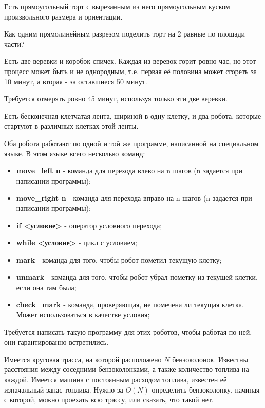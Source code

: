 \begin{problem}

Есть прямоугольный торт с вырезанным из него прямоугольным куском произвольного размера и ориентации.

Как одним прямолинейным разрезом поделить торт на 2 равные по площади части?

\end{problem}
\begin{problem}

Есть две веревки и коробок спичек. Каждая из веревок горит ровно час, но этот процесс может быть и не однородным, т.е. первая её половина может сгореть за 10 минут, а вторая - за оставшиеся 50 минут.

Требуется отмерять ровно 45 минут, используя только эти две веревки.

\end{problem}
\begin{problem}

Есть бесконечная клетчатая лента, шириной в одну клетку, и два робота, которые стартуют в различных клетках этой ленты.

Оба робота работают по одной и той же программе, написанной на специальном языке.
В этом языке всего несколько команд:
\begin{itemize}
\item \textbf{move\_left n} - команда для перехода влево на n шагов (n задается при написании программы);
\item \textbf{move\_right n} - команда для перехода вправо на n шагов (n задается при написании программы);
\item \textbf{if <условие>} - оператор условного перехода;
\item \textbf{while <условие>} - цикл с условием;
\item \textbf{mark} - команда для того, чтобы робот пометил текущую клетку;
\item \textbf{unmark} - команда для того, чтобы робот убрал пометку из текущей клетки, если она там была;
\item \textbf{check\_mark} - команда, проверяющая, не помечена ли текущая клетка. Может использоваться в качестве условия;
\end{itemize}

Требуется написать такую программу для этих роботов, чтобы работая по ней, они гарантированно встретились.

\end{problem}
\begin{problem}

Имеется круговая трасса, на которой расположено $N$ бензоколонок. Известны расстояния между соседними бензоколонками, а также количество топлива на каждой.
Имеется машина с постоянным расходом топлива, известен её изначальный запас топлива. Нужно за $O(N)$ определить бензоколонку, начиная с которой, можно проехать всю трассу, или сказать, что такой нет.

\end{problem}
